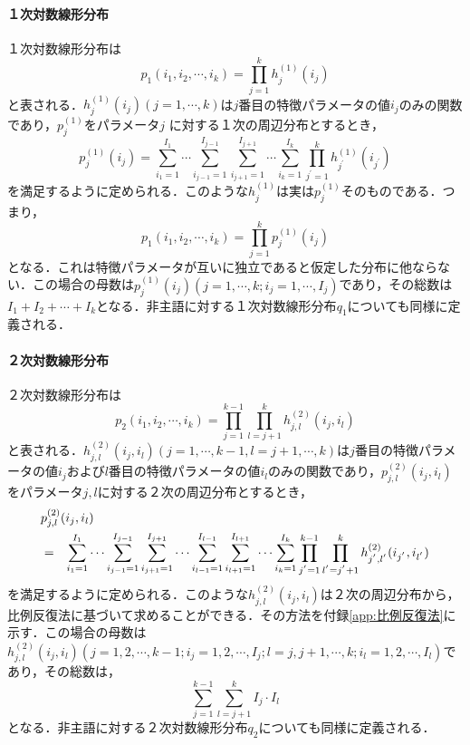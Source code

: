 \paragraph{１次対数線形分布} 
１次対数線形分布は
\begin{equation}
 p_{1}(i_{1},i_{2}, \cdots ,i_{k})=
  \prod_{j=1}^{k} h^{(1)}_{j}(i_{j})
\end{equation}
と表される．$h^{(1)}_{j}(i_{j}) (j=1,\cdots,k)$は$j$番目の特徴パラメータの値$i_{j}$のみの関数であり，$p^{(1)}_{j}$をパラメータ$j$ に対する１次の周辺分布とするとき，
\begin{equation}
 p^{(1)}_{j}(i_{j})=
  \sum_{i_{1}=1}^{I_{1}} \cdots \sum_{i_{j-1}=1}^{I_{j-1}}
  \sum_{i_{j+1}=1}^{I_{j+1}} \cdots \sum_{i_{k}=1}^{I_{k}}
  \prod_{j^{'}=1}^{k} h^{(1)}_{j^{'}}(i_{j^{'}})
\end{equation}
を満足するように定められる．このような$h^{(1)}_{j}$は実は$p^{(1)}_{j}$そのものである．つまり，
\begin{equation}
  p_{1}(i_{1},i_{2}, \cdots ,i_{k})=
    \prod_{j=1}^{k} p^{(1)}_{j}(i_{j})
\end{equation}
となる．これは特徴パラメータが互いに独立であると仮定した分布に他ならない．この場合の母数は$p^{(1)}_{j}(i_{j}) (j=1, \cdots ,k; i_{j}=1, \cdots ,I_{j})$であり，その総数は$I_{1}+I_{2}+ \cdots +I_{k}$となる．非主語に対する１次対数線形分布$q_{1}$についても同様に定義される．

\paragraph{２次対数線形分布} 
２次対数線形分布は
\begin{equation}
  p_{2}(i_{1},i_{2}, \cdots ,i_{k})= 
   \prod_{j=1}^{k-1} \prod_{l=j+1}^{k}
   h^{(2)}_{j,l}(i_{j},i_{l})
\end{equation}
と表される．$h^{(2)}_{j,l}(i_{j},i_{l}) (j=1,\cdots,k-1, l=j+1,\cdots,k)$は$j$番目の特徴パラメータの値$i_{j}$および$l$番目の特徴パラメータの値$i_{l}$のみの関数であり，$p^{(2)}_{j,l}(i_{j},i_{l})$をパラメータ$j,l$に対する２次の周辺分布とするとき，
\begin{eqnarray}
 \lefteqn{
  p^{(2)}_{j,l}(i_{j},i_{l})
 }  \nonumber \\
 &=& \sum_{i_{1}=1}^{I_{1}} \cdots \sum_{i_{j-1}=1}^{I_{j-1}}
  \sum_{i_{j+1}=1}^{I_{j+1}} \cdots \sum_{i_{l-1}=1}^{I_{l-1}}
  \sum_{i_{l+1}=1}^{I_{l+1}} \cdots \sum_{i_{k}=1}^{I_{k}}
  \prod_{j^{'}=1}^{k-1} \prod_{l^{'}=j^{'}+1}^{k}
    h^{(2)}_{j^{'},l^{'}}(i_{j^{'}},i_{l^{'}})
    \label{eq:制約式２}
\end{eqnarray}
を満足するように定められる．このような$h^{(2)}_{j,l}(i_{j},i_{l})$は２次の周辺分布から，比例反復法\cite[pp.235-238]{廣津82}に基づいて求めることができる．その方法を付録\ref{app:比例反復法}に示す．この場合の母数は$h^{(2)}_{j,l}(i_{j},i_{l}) (j=1,2, \cdots ,k-1; i_{j}=1,2, \cdots ,I_{j}; l=j,j+1, \cdots ,k; i_{l}=1,2, \cdots ,I_{l})$であり，その総数は，
\begin{equation}
  \sum_{j=1}^{k-1} \sum_{l=j+1}^{k} I_{j} \cdot I_{l}
\end{equation}
となる．非主語に対する２次対数線形分布$q_{2}$についても同様に定義される．

